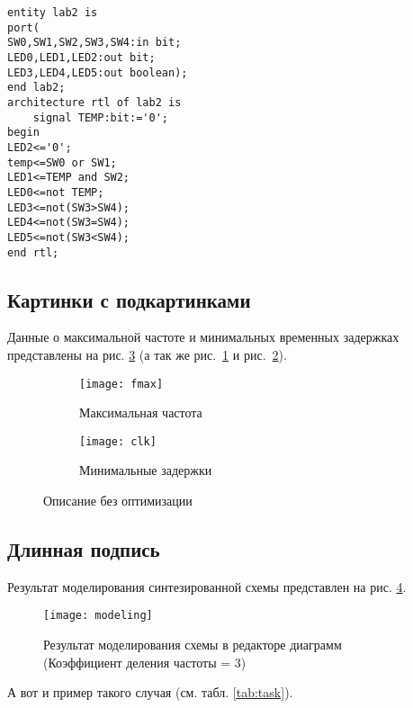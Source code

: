 \begin{lstlisting}[label=lst:VHDL,caption=Описание схемы]
entity lab2 is
port(
SW0,SW1,SW2,SW3,SW4:in bit;
LED0,LED1,LED2:out bit;
LED3,LED4,LED5:out boolean);
end lab2;
architecture rtl of lab2 is
	signal TEMP:bit:='0';
begin
LED2<='0';
temp<=SW0 or SW1;
LED1<=TEMP and SW2;
LED0<=not TEMP;
LED3<=not(SW3>SW4);
LED4<=not(SW3=SW4);
LED5<=not(SW3<SW4);
end rtl;
\end{lstlisting}

\subsection{Картинки с подкартинками}

Данные о максимальной частоте и минимальных временных задержках представлены на рис. \ref{pic:base} (а так же рис.~\ref{pic:fmax} и рис.~\ref{pic:clk}).\cite{subcap}

\begin{figure}[H]
	\begin{subfigure}{.4\linewidth}\centering
		\texttt{[image: fmax]}
		\caption{Максимальная частота}
		\label{pic:fmax}
	\end{subfigure}
	\begin{subfigure}{.6\linewidth}\centering
		\texttt{[image: clk]}
		\caption{Минимальные задержки}
		\label{pic:clk}
	\end{subfigure}
\caption{Описание без оптимизации}
\label{pic:base}
\end{figure}

\subsection{Длинная подпись}

Результат моделирования синтезированной схемы представлен на рис. \ref{pic:modeling}. 

\begin{figure}[H]
\centering
\captionsetup{justification=centering} %
\texttt{[image: modeling]}
\caption{Результат моделирования схемы в редакторе диаграмм \\ (Коэффициент деления частоты = 3)}
\label{pic:modeling}
\end{figure}

А вот и пример такого случая (см. табл. \ref{tab:task}).


